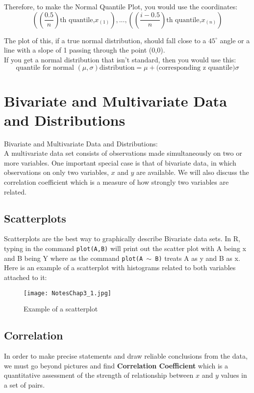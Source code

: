 \documentclass{article}
\newcommand{\code}[1]{\texttt{#1}} %
\begin{document}
	Therefore, to make the Normal Quantile Plot, you would use the coordinates:
	\[ \left(\left(\frac{0.5}{n}\right)\text{th quantile,} x_{(1)}\right),...,\left(\left(\frac{i-0.5}{n}\right)
	\text{th quantile,} x_{(n)}\right)\]

	The plot of this, if a true normal distribution, should fall close to a $45^\circ$ angle or a line 
	with a slope of 1 passing through the point (0,0). \\

	If you get a normal distribution that isn't standard, then you would use this:
	\[ \text{quantile for normal }(\mu , \sigma) \text{distribution} = \mu + \text{(corresponding z 
	quantile)}\sigma \]
	
	

\clearpage	
\section{Bivariate and Multivariate Data and Distributions} %
Bivariate and Multivariate Data and Distributions: \\
	
A multivariate data set consists of observations made simultaneously on two or more variables. 
One important special case is that of bivariate data, in which observations on only two 
variables, $x$ and $y$  are available. We will also discuss the correlation coefficient which is a 
measure of how strongly two variables are related.
	
	\subsection{Scatterplots} %
	Scatterplots are the best way to graphically describe Bivariate data sets. In R, typing in the 
	command \code{plot(A,B)} will print out the scatter plot with A being x and B being Y where 
	as the command \code{plot(A $\sim$ B)} treats A as y and B as x. Here is an example of a 
	scatterplot with histograms related to both variables attached to it:
	\begin{figure}[!htb]
	   \centering
	   \texttt{[image: NotesChap3\_1.jpg]} 
	   \caption{Example of a scatterplot}
	   \label{fig:example_scatterplot}
	\end{figure}
	
	\subsection{Correlation} %
	In order to make precise statements and draw reliable conclusions from the data, we must 
	go beyond pictures and find \textbf{Correlation Coefficient} which is a quantitative 
	assessment of the strength of relationship between $x$ and $y$ values in a set of pairs. \\
	
\end{document}
